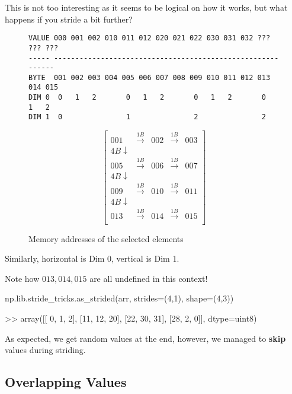 \documentclass[oneside, 12pt]{report}
\begin{document}
This is not too interesting as it seems to be logical on how it works, but what happens if you stride a bit further?

\begin{figure}[H]
\begin{verbatim}
VALUE 000 001 002 010 011 012 020 021 022 030 031 032 ??? ??? ???
----- -----------------------------------------------------------
BYTE  001 002 003 004 005 006 007 008 009 010 011 012 013 014 015
DIM 0  0   1   2       0   1   2       0   1   2       0   1   2  
DIM 1  0               1               2               2          
\end{verbatim}
\end{figure}

\begin{figure}[H]
\begin{equation*}
\begin{bmatrix}
001 & \xrightarrow{1B} & 002 &\xrightarrow{1B} & 003 \\
4B \downarrow \\
005 & \xrightarrow{1B} & 006 &\xrightarrow{1B} & 007 \\
4B \downarrow \\
009 & \xrightarrow{1B} & 010 &\xrightarrow{1B} & 011 \\
4B \downarrow \\
013 & \xrightarrow{1B} & 014 &\xrightarrow{1B} & 015 \\
\end{bmatrix}
\end{equation*}
\caption{Memory addresses of the selected elements}
\end{figure}

\begin{shaded}
Similarly, horizontal is Dim 0, vertical is Dim 1.

Note how $013, 014, 015$ are all undefined in this context!
\end{shaded}

\begin{python}
np.lib.stride_tricks.as_strided(arr, strides=(4,1), shape=(4,3))

>> array([[ 0,  1,  2],
          [11, 12, 20],
          [22, 30, 31],
          [28,  2,  0]], dtype=uint8)
\end{python}

As expected, we get random values at the end, however, we managed to \textbf{skip} values during striding.

\subsection{Overlapping Values}
\end{document}
